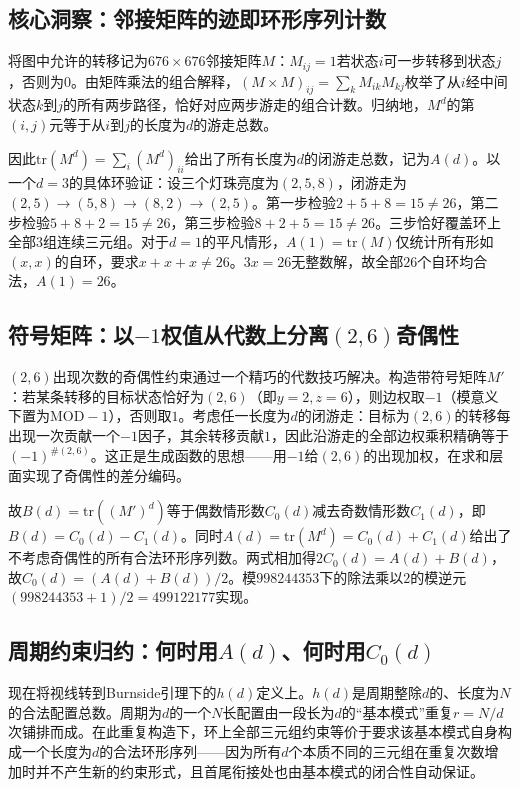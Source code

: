 \subsection{核心洞察：邻接矩阵的迹即环形序列计数}

将图中允许的转移记为$676\times 676$邻接矩阵$M$：$M_{ij}=1$若状态$i$可一步转移到状态$j$，否则为$0$。由矩阵乘法的组合解释，$(M\times M)_{ij}=\sum_k M_{ik}M_{kj}$枚举了从$i$经中间状态$k$到$j$的所有两步路径，恰好对应两步游走的组合计数。归纳地，$M^d$的第$(i,j)$元等于从$i$到$j$的长度为$d$的游走总数。

因此$\mathrm{tr}(M^d)=\sum_i (M^d)_{ii}$给出了所有长度为$d$的闭游走总数，记为$A(d)$。以一个$d=3$的具体环验证：设三个灯珠亮度为$(2,5,8)$，闭游走为$(2,5)\to(5,8)\to(8,2)\to(2,5)$。第一步检验$2+5+8=15\neq 26$，第二步检验$5+8+2=15\neq 26$，第三步检验$8+2+5=15\neq 26$。三步恰好覆盖环上全部$3$组连续三元组。对于$d=1$的平凡情形，$A(1)=\mathrm{tr}(M)$仅统计所有形如$(x,x)$的自环，要求$x+x+x\neq 26$。$3x=26$无整数解，故全部$26$个自环均合法，$A(1)=26$。

\subsection{符号矩阵：以$-1$权值从代数上分离$(2,6)$奇偶性}

$(2,6)$出现次数的奇偶性约束通过一个精巧的代数技巧解决。构造带符号矩阵$M'$：若某条转移的目标状态恰好为$(2,6)$（即$y=2,z=6$），则边权取$-1$（模意义下置为$\mathrm{MOD}-1$），否则取$1$。考虑任一长度为$d$的闭游走：目标为$(2,6)$的转移每出现一次贡献一个$-1$因子，其余转移贡献$1$，因此沿游走的全部边权乘积精确等于$(-1)^{\#(2,6)}$。这正是生成函数的思想——用$-1$给$(2,6)$的出现加权，在求和层面实现了奇偶性的差分编码。

故$B(d)=\mathrm{tr}((M')^d)$等于偶数情形数$C_0(d)$减去奇数情形数$C_1(d)$，即$B(d)=C_0(d)-C_1(d)$。同时$A(d)=\mathrm{tr}(M^d)=C_0(d)+C_1(d)$给出了不考虑奇偶性的所有合法环形序列数。两式相加得$2C_0(d)=A(d)+B(d)$，故$C_0(d)=(A(d)+B(d))/2$。模$998244353$下的除法乘以$2$的模逆元$(998244353+1)/2=499122177$实现。

\subsection{周期约束归约：何时用$A(d)$、何时用$C_0(d)$}

现在将视线转到Burnside引理下的$h(d)$定义上。$h(d)$是周期整除$d$的、长度为$N$的合法配置总数。周期为$d$的一个$N$长配置由一段长为$d$的“基本模式”重复$r=N/d$次铺排而成。在此重复构造下，环上全部三元组约束等价于要求该基本模式自身构成一个长度为$d$的合法环形序列——因为所有$d$个本质不同的三元组在重复次数增加时并不产生新的约束形式，且首尾衔接处也由基本模式的闭合性自动保证。

